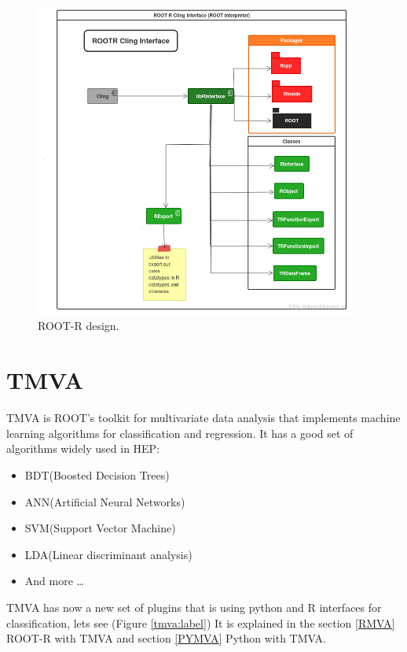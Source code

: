 \documentclass[a4paper]{jpconf}
\begin{document}
\begin{figure}[h]
\centering
\includegraphics[width=25pc]{img/rootr.png}\caption{\label{rootr:label} ROOT-R design.}
\end{figure}


\section{TMVA}
TMVA is ROOT's toolkit for multivariate data analysis
that implements machine learning algorithms for
classification and regression.
It has a good set of algorithms widely used in HEP:
\begin{itemize}  
\item BDT(Boosted Decision Trees)
\item ANN(Artificial Neural Networks)
\item SVM(Support Vector Machine)
\item LDA(Linear discriminant analysis)
\item And more \ldots 
\end{itemize}
TMVA has now a new set of plugins that is using python and R interfaces for classification, lets see (Figure \ref{tmva:label})
It is explained in the  section \ref{RMVA} ROOT-R with TMVA and section \ref{PYMVA} Python with TMVA.
\end{document}
